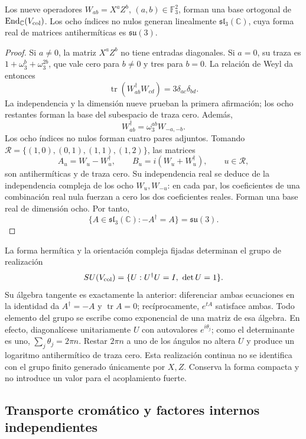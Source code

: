 \begin{theorem}
\label{hmtcuatro:color:algebra}
Los nueve operadores \(W_{ab}=X^aZ^b\),
\((a,b)\in\mathbb F_3^2\), forman una base ortogonal de
\(\operatorname{End}_{\mathbb C}(V_{\rm col})\). Los ocho índices
no nulos generan linealmente \(\mathfrak{sl}_3(\mathbb C)\), cuya
forma real de matrices antihermíticas es \(\mathfrak{su}(3)\).
\end{theorem}
\begin{proof}
Si \(a\ne0\), la matriz \(X^aZ^b\) no tiene entradas diagonales.
Si \(a=0\), su traza es \(1+\omega_3^b+\omega_3^{2b}\), que
vale cero para \(b\ne0\) y tres para \(b=0\). La relación de
Weyl da entonces
\[
 \operatorname{tr}(W_{ab}^{\dagger}W_{cd})
 =3\delta_{ac}\delta_{bd}.
\]
La independencia y la dimensión nueve prueban la primera afirmación;
los ocho restantes forman la base del subespacio de traza cero.
Además,
\[
 W_{ab}^{\dagger}=\omega_3^{ab}W_{-a,-b}.
\]
Los ocho índices no nulos forman cuatro pares adjuntos. Tomando
\(\mathcal R=\{(1,0),(0,1),(1,1),(1,2)\}\), las matrices
\[
 A_u=W_u-W_u^{\dagger},\qquad
 B_u=i(W_u+W_u^{\dagger}),\qquad u\in\mathcal R,
\]
son antihermíticas y de traza cero. Su independencia real se deduce
de la independencia compleja de los ocho \(W_u,W_{-u}\): en cada
par, los coeficientes de una combinación real nula fuerzan a cero
los dos coeficientes reales. Forman una base real de dimensión ocho.
Por tanto,
\[
 \{A\in\mathfrak{sl}_3(\mathbb C):-A^{\dagger}=A\}
 =\mathfrak{su}(3).
\]
\end{proof}

La forma hermítica y la orientación compleja fijadas determinan el
grupo de realización
\[
 SU(V_{\rm col})=\{U:U^{\dagger}U=I,\ \det U=1\}.
\]
Su álgebra tangente es exactamente la anterior: diferenciar ambas
ecuaciones en la identidad da \(A^{\dagger}=-A\) y
\(\operatorname{tr}A=0\); recíprocamente, \(e^{tA}\) satisface
ambas. Todo elemento del grupo se escribe como exponencial de una
matriz de esa álgebra. En efecto, diagonalícese unitariamente \(U\)
con autovalores \(e^{i\theta_j}\); como el determinante es uno,
\(\sum_j\theta_j=2\pi n\). Restar \(2\pi n\) a uno de los
ángulos no altera \(U\) y produce un logaritmo antihermítico de
traza cero. Esta realización continua no se identifica con el grupo
finito generado únicamente por \(X,Z\). Conserva la forma compacta
y no introduce un valor para el acoplamiento fuerte.

\subsection{Transporte cromático y factores internos independientes}
\label{hmtcuatro:color:transporte}

